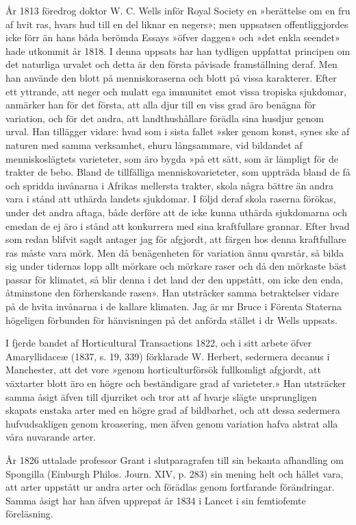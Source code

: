 År 1813 föredrog doktor W. C. Wells inför Royal Society en »berättelse om en fru af hvit ras, hvars hud till en del liknar en negers»; men uppsatsen offentliggjordes icke förr än hans båda berömda Essays »öfver daggen» och »det enkla seendet» hade utkommit år 1818. I denna uppsats har han tydligen uppfattat principen om det naturliga urvalet och detta är den första påvisade framställning deraf. Men han använde den blott på menniskoraserna och blott på vissa karakterer. Efter ett yttrande, att neger och mulatt ega immunitet emot vissa tropiska sjukdomar, anmärker han för det första, att alla djur till en viss grad äro benägna för variation, och för det andra, att landthushållare förädla sina husdjur genom urval. Han tillägger vidare: hvad som i sista fallet »sker genom konst, synes ske af naturen med samma verksamhet, ehuru långsammare, vid bildandet af menniskoslägtets varieteter, som äro bygda »på ett sätt, som är lämpligt för de trakter de bebo. Bland de tillfälliga menniskovarieteter, som uppträda bland de få och spridda invånarna i Afrikas mellersta trakter, skola några bättre än andra vara i stånd att uthärda landets sjukdomar. I följd deraf skola raserna förökas, under det andra aftaga, både derföre att de icke kunna uthärda sjukdomarna och emedan de ej äro i stånd att konkurrera med sina kraftfullare grannar. Efter hvad som redan blifvit sagdt antager jag för afgjordt, att färgen hos denna kraftfullare ras måste vara mörk. Men då benägenheten för variation ännu qvarstår, så bilda sig under tidernas lopp allt mörkare och mörkare raser och då den mörkaste bäst passar för klimatet, så blir denna i det land der den uppstått, om icke den enda, åtminstone den förherskande rasen». Han utsträcker samma betraktelser vidare på de hvita invånarna i de kallare klimaten. Jag är mr Bruce i Förenta Staterna högeligen förbunden för hänvisningen på det anförda stället i dr Wells uppsats.

I fjerde bandet af Horticultural Transactions 1822, och i sitt arbete öfver Amaryllidaceæ (1837, s. 19, 339) förklarade W. Herbert, sedermera decanus i Manchester, att det vore »genom horticulturförsök fullkomligt afgjordt, att växtarter blott äro en högre och beständigare grad af varieteter.» Han utsträcker samma åsigt äfven till djurriket och tror att af hvarje slägte ursprungligen skapats enstaka arter med en högre grad af bildbarhet, och att dessa sedermera hufvudsakligen genom kroasering, men äfven genom variation hafva alstrat alla våra nuvarande arter.

År 1826 uttalade professor Grant i slutparagrafen till sin bekanta afhandling om Spongilla (Einburgh Philos. Journ. XIV, p. 283) sin mening helt och hållet vara, att arter uppstått ur andra arter och förädlas genom fortfarande förändringar. Samma åsigt har han äfven upprepat år 1834 i Lancet i sin femtiofemte föreläsning.

